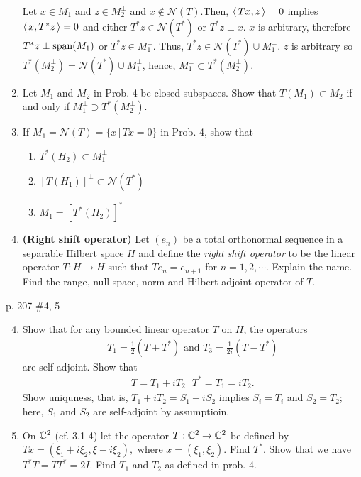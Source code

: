 \documentclass[10pt,a4paper]{report}
\begin{document}
\begin{enumerate}
	 Let $x \in M_1$ and $z \in M_2^\perp$ and $x \not \in \mathcal{N}(T)$.Then, $\left \langle\, Tx, z \,\right \rangle=0$ implies $\left \langle\, x, T^*z \,\right \rangle=0$ and either $T^*z \in \mathcal{N}(T^*)$ or $T^*z \perp x$.  $x$ is arbitrary, therefore $T^*z \perp \operatorname{span}(M_1)$ or $T^*z \in M_1^\perp$.  Thus, $T^*z \in \mathcal{N}(T^*) \cup M_1^\perp$.  $z$ is arbitrary so $T^*(M_2^\perp) = \mathcal{N}(T^*) \cup M_1^\perp$, hence, $M_1^\perp \subset T^*(M_2^\perp)$.
	
	\item Let $M_1$ and $M_2$ in Prob. 4 be closed subspaces.   Show that $T(M_1)\subset M_2$ if and only if $M_1^\perp \supset T^*(M_2^\perp)$.
	
	\item If $M_1=\mathcal{N}(T)=\{x\,|\,Tx=0\}$ in Prob. 4, show that 
	\begin{enumerate}
		\item $T^*(H_2) \subset M_1^\perp$
		\item $[T(H_1)]^\perp \subset \mathcal{N}(T^*)$
		\item $M_1=[T^*(H_2)]^*$
	\end{enumerate}
	\setcounter{enumi}{9}
	\item \textbf{(Right shift operator)} Let $(e_n)$ be a total orthonormal sequence in a separable Hilbert space $H$ and define the \textit{right shift operator} to be the linear operator $T: H \to H$ such that $Te_n=e_{n+1}$ for $n=1,2,\cdots$.  Explain the name.  Find the range, null space, norm and Hilbert-adjoint operator of $T$.

\end{enumerate}

\newpage
p. 207 \#4, 5

\begin{enumerate}
	\setcounter{enumi}{3}
	\item Show that for any bounded linear operator $T$ on $H$, the operators 
	\begin{align*}
		T_1=\frac{1}{2}(T+T^*) \text{  and  } T_3=\frac{1}{2i}(T-T^*)
	\end{align*}are self-adjoint.  Show that 
	\begin{align*}
		T=T_1+iT_2 \text{      } T^*=T_1=iT_2.
	\end{align*}Show uniquness, that is, $T_1+iT_2=S_1+iS_2$ implies $S_i=T_i$ and $S_2=T_2$; here, $S_1$ and $S_2$ are self-adjoint by assumptioin.
	
	\item On $\mathbb{C}^2$ (cf. 3.1-4) let the operator $T: \mathbb{C}^2\to \mathbb{C}^2$ be defined by $Tx=(\xi_1+i\xi_2, \xi-i\xi_2),$ where $x=(\xi_1,\xi_2)$.  Find $T^*$.  Show that we have $T^*T=TT^*=2I$.  Find $T_1$ and $T_2$ as defined in prob. 4.

\end{enumerate}
\end{document}
